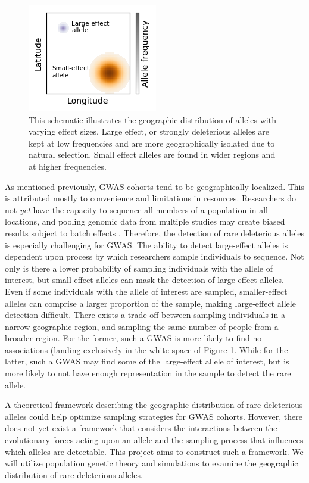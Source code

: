 \begin{figure}[h]
    \centering
\includegraphics[scale=1.5]{img/spatial_distributions.png}
    \caption{This schematic illustrates the geographic distribution of alleles with varying effect sizes. Large effect, or strongly deleterious alleles are kept at low frequencies and are more geographically isolated due to natural selection. Small effect alleles are found in wider regions and at higher frequencies.}
    \label{fig:spatial_schematic}
\end{figure}


As mentioned previously, GWAS cohorts tend to be geographically localized. This is attributed mostly to convenience and limitations in resources. Researchers do not \textit{yet} have the capacity to sequence all members of a population in all locations, and pooling genomic data from multiple studies may create biased results subject to batch effects \cite{woolston_potential_2015}\cite{gilad_reanalysis_2015}. Therefore, the detection of rare deleterious alleles is especially challenging for GWAS. The ability to detect large-effect alleles is dependent upon process by which researchers sample individuals to sequence. Not only is there a lower probability of sampling individuals with the allele of interest, but small-effect alleles can mask the detection of large-effect alleles. Even if some individuals with the allele of interest are sampled, smaller-effect alleles can comprise a larger proportion of the sample, making large-effect allele detection difficult. There exists a trade-off between sampling individuals in a narrow geographic region, and sampling the same number of people from a broader region. For the former, such a GWAS is more likely to find no associations (landing exclusively in the white space of Figure \ref{fig:spatial_schematic}. While for the latter, such a GWAS may find some of the large-effect allele of interest, but is more likely to not have enough representation in the sample to detect the rare allele. 


A theoretical framework describing the geographic distribution of rare deleterious alleles could help optimize sampling strategies for GWAS cohorts. However, there does not yet exist a framework that considers the interactions between the evolutionary forces acting upon an allele and the sampling process that influences which alleles are detectable. This project aims to construct such a framework. We will utilize population genetic theory and simulations to examine the geographic distribution of rare deleterious alleles. 


